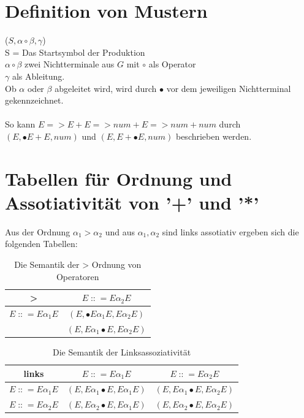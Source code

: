 \documentclass[t]{beamer}
\renewcommand{\Coloneqq}{\mathrel{\mathop{::}}=}
\begin{document}
	\section{Definition von Mustern}\label{sec:muster-zur-beseitigung-der-mehrdeutigkeit-von-operatoren}
	\begin{frame}
	($S, \alpha \circ \beta, \gamma$)
		\\
		S = Das Startsymbol der Produktion \\
		$\alpha \circ \beta$ zwei Nichtterminale aus $G$ mit $\circ$ als Operator \\
		$\gamma$ als Ableitung. \\
		Ob $\alpha$ oder $\beta$ abgeleitet wird, wird durch $\bullet$ vor dem jeweiligen Nichtterminal gekennzeichnet.
		\\\\
		So kann $E => E + E => num + E => num + num$ durch
		$(E, \bullet{E}+E, num)$ und $(E, E+\bullet{E}, num)$ beschrieben werden.
	\end{frame}


	\section{Tabellen für Ordnung und Assotiativität von '+' und '*'}\label{sec:tabellen-fur-ordnung-und-assotiativitat-von-'+'-und-'*'}
	\begin{frame}
		Aus der Ordnung $ \alpha_{1} > \alpha_{2}$ und aus $\alpha_{1}, \alpha_{2}$ sind links assotiativ ergeben sich die folgenden Tabellen:
		\begin{table}[h]
			\centering
			\caption{Die Semantik der > Ordnung von Operatoren}
			\begin{tabular}{|c|c|}
				\hline
				>                          & $E \Coloneqq E\alpha_{2}E$                   \\
				\hline
				$E \Coloneqq E\alpha_{1}E$ & $(E, \bullet{E}\alpha_{1}E, {E}\alpha_{2}E)$ \\
				& $(E, E\alpha_{1}\bullet{E}, E\alpha_{2}E)$   \\
				\hline
			\end{tabular}\label{tab:table}
		\end{table}

		\begin{table}[h]
			\centering
			\caption{Die Semantik der Linksassoziativität}
			\begin{tabular}{|c|c|c|}
				\hline
				links                      & $E \Coloneqq E\alpha_{1}E$                 & $E \Coloneqq E\alpha_{2}E$                 \\
				\hline
				$E \Coloneqq E\alpha_{1}E$ & $(E, E\alpha_{1}\bullet{E}, E\alpha_{1}E)$ & $(E, E\alpha_{1}\bullet{E}, E\alpha_{2}E)$ \\
				\hline
				$E \Coloneqq E\alpha_{2}E$ & $(E, E\alpha_{2}\bullet{E}, E\alpha_{1}E)$ & $(E, E\alpha_{2}\bullet{E}, E\alpha_{2}E)$ \\
				\hline
			\end{tabular}\label{tab:table2}
		\end{table}
	\end{frame}
\end{document}
